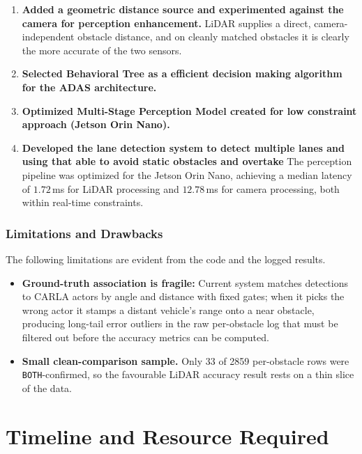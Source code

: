 \documentclass[12pt, a4paper]{report}
\begin{document}
\begin{enumerate}
    \item \textbf{Added a geometric distance source and experimented against the camera for perception enhancement.} LiDAR supplies
    a direct, camera-independent obstacle distance, and on cleanly matched
    obstacles it is clearly the more accurate of the two sensors.
  \item \textbf{Selected Behavioral Tree as a efficient decision making algorithm for the \ac{ADAS} architecture.}
  \item \textbf{Optimized Multi-Stage Perception Model created for low constraint approach (Jetson Orin Nano).} 
  \item \textbf{Developed the lane detection system to detect multiple lanes and using that able to avoid static obstacles and overtake}
 The perception pipeline was optimized for the Jetson Orin Nano, achieving a median latency of $1.72$\,ms for LiDAR processing and $12.78$\,ms for camera processing, both within real-time constraints.
 

\end{enumerate}

\subsection{Limitations and Drawbacks}
\label{sec:limitations}

The following limitations are evident from the code and the logged results.

\begin{itemize}
    \item \textbf{Ground-truth association is fragile:}
    Current system matches detections to CARLA actors by angle
    and distance with fixed gates; when it picks the wrong actor it stamps a
    distant vehicle's range onto a near obstacle, producing long-tail error
    outliers in the raw per-obstacle log that must be filtered out before the
    accuracy metrics can be computed.

    \item \textbf{Small clean-comparison sample.} Only 33 of 2859 per-obstacle
    rows were \texttt{BOTH}-confirmed, so the favourable LiDAR accuracy result
    rests on a thin slice of the data.

\end{itemize}


\chapter{Timeline and Resource Required}
\end{document}
